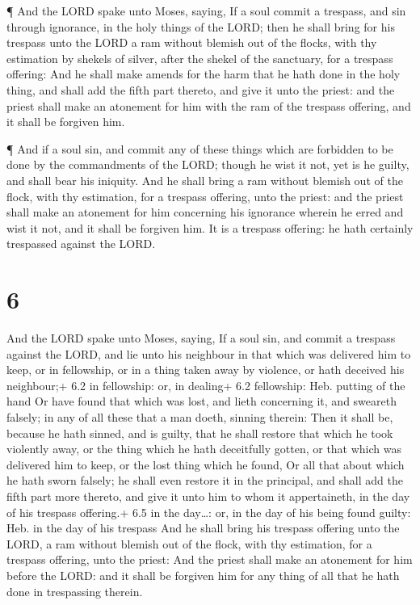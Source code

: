  ¶ And the LORD spake unto Moses, saying,  If
a soul commit a trespass, and sin through ignorance, in the holy things
of the LORD; then he shall bring for his trespass unto the LORD a ram
without blemish out of the flocks, with thy estimation by shekels of
silver, after the shekel of the sanctuary, for a trespass offering:
 And he shall make amends for the harm that he hath done in
the holy thing, and shall add the fifth part thereto, and give it unto
the priest: and the priest shall make an atonement for him with the ram
of the trespass offering, and it shall be forgiven him.

 ¶ And if a soul sin, and commit any of these things which
are forbidden to be done by the commandments of the LORD; though he wist
it not, yet is he guilty, and shall bear his iniquity.  And
he shall bring a ram without blemish out of the flock, with thy
estimation, for a trespass offering, unto the priest: and the priest
shall make an atonement for him concerning his ignorance wherein he
erred and wist it not, and it shall be forgiven him.  It is
a trespass offering: he hath certainly trespassed against the LORD.

\hypertarget{section-5}{%
\section{6}\label{section-5}}

 And the LORD spake unto Moses, saying,  If a
soul sin, and commit a trespass against the LORD, and lie unto his
neighbour in that which was delivered him to keep, or in fellowship, or
in a thing taken away by violence, or hath deceived his neighbour;+ 6.2
in fellowship: or, in dealing+ 6.2 fellowship: Heb. putting of the hand
 Or have found that which was lost, and lieth concerning it,
and sweareth falsely; in any of all these that a man doeth, sinning
therein:  Then it shall be, because he hath sinned, and is
guilty, that he shall restore that which he took violently away, or the
thing which he hath deceitfully gotten, or that which was delivered him
to keep, or the lost thing which he found,  Or all that
about which he hath sworn falsely; he shall even restore it in the
principal, and shall add the fifth part more thereto, and give it unto
him to whom it appertaineth, in the day of his trespass offering.+ 6.5
in the day\ldots: or, in the day of his being found guilty: Heb. in the
day of his trespass  And he shall bring his trespass
offering unto the LORD, a ram without blemish out of the flock, with thy
estimation, for a trespass offering, unto the priest:  And
the priest shall make an atonement for him before the LORD: and it shall
be forgiven him for any thing of all that he hath done in trespassing
therein.

